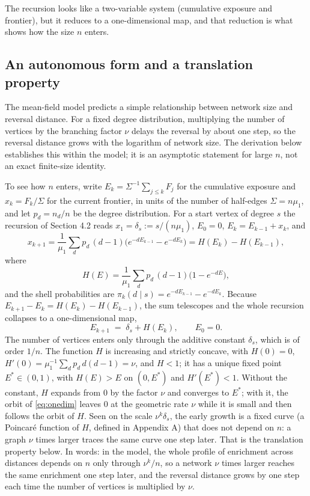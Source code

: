 \documentclass{nws}
\begin{document}
The recursion looks like a two-variable system (cumulative exposure and frontier), but it reduces to a one-dimensional map, and that reduction is what shows how the size $n$ enters.


\subsection{An autonomous form and a translation property}

The mean-field model predicts a simple relationship between network size and reversal distance. For a fixed degree distribution, multiplying the number of vertices by the branching factor $\nu$ delays the reversal by about one step, so the reversal distance grows with the logarithm of network size. The derivation below establishes this within the model; it is an asymptotic statement for large $n$, not an exact finite-size identity.

To see how $n$ enters, write $E_k=\Sigma^{-1}\sum_{j\le k}F_j$ for the cumulative exposure and
$x_k=F_k/\Sigma$ for the current frontier, in units of the number of half-edges
$\Sigma=n\mu_1$, and let $p_d=n_d/n$ be the degree distribution. For a start vertex of
degree $s$ the recursion of Section 4.2 reads $x_1=\delta_s:=s/(n\mu_1)$,
$E_0=0$, $E_k=E_{k-1}+x_k$, and
\begin{equation*}
x_{k+1}=\frac1{\mu_1}\sum_d p_d\,(d-1)\bigl(e^{-dE_{k-1}}-e^{-dE_k}\bigr)=H(E_k)-H(E_{k-1}),
\end{equation*}
where
\begin{equation*}
H(E)=\frac1{\mu_1}\sum_d p_d\,(d-1)\bigl(1-e^{-dE}\bigr),
\end{equation*}
and the shell probabilities are $\pi_k(d\mid s)=e^{-dE_{k-1}}-e^{-dE_k}$. Because
$E_{k+1}-E_k=H(E_k)-H(E_{k-1})$, the sum telescopes and the whole recursion
collapses to a one-dimensional map,
\begin{equation}\label{eq:onedim}
E_{k+1}\;=\;\delta_s+H(E_k),\qquad E_0=0 .
\end{equation}
The number of vertices enters only through the additive constant $\delta_s$, which is
of order $1/n$. The function $H$ is increasing and strictly concave, with $H(0)=0$,
$H'(0)=\mu_1^{-1}\sum_dp_d\,d(d-1)=\nu$, and $H<1$; it has a unique fixed point
$E^*\in(0,1)$, with $H(E)>E$ on $(0,E^*)$ and $H'(E^*)<1$. Without the constant,
$H$ expands from $0$ by the factor $\nu$ and converges to $E^*$; with it, the orbit of
\eqref{eq:onedim} leaves $0$ at the geometric rate $\nu$ while it is small and then
follows the orbit of $H$. Seen on the scale $\nu^k\delta_s$, the early growth is a fixed
curve (a Poincar\'e function of $H$, defined in Appendix A) that does not depend on $n$: a graph
$\nu$ times larger traces the same curve one step later. That is the translation property below. In words: in the model, the whole profile of enrichment across distances depends on $n$ only through $\nu^k/n$, so a network $\nu$ times larger reaches the same enrichment one step later, and the reversal distance grows by one step each time the number of vertices is multiplied by $\nu$.
\end{document}
